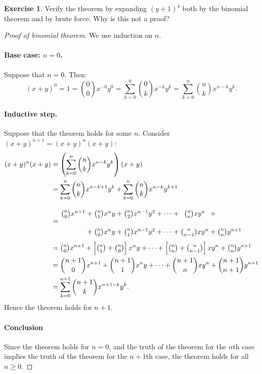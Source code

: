 \documentclass[a4paper,leqno]{article}
\numberwithin{equation}{section}
\theoremstyle{definition}
\newtheorem{exercise}[equation]{Exercise}
\theoremstyle{remark}
\begin{document}
\begin{exercise}
  Verify the theorem by expanding $ (y + 1)^4 $ both by the binomial theorem and by brute force. Why is this not a proof?
\end{exercise}

\begin{proof}[Proof of binomial theorem]
  We use induction on $ n $.

  \paragraph{Base case: $ n = 0 $.}
  Suppose that $ n = 0 $. Then:
  \begin{displaymath}
    (x + y)^0 = 1 = \binom{0}{0} x^{-0} y^0 = \sum_{k = 0}^0 \binom{0}{k} x^{-k} y^k = \sum_{k = 0}^n \binom{n}{k} x^{n - k} y^k.
  \end{displaymath}

  \paragraph{Inductive step.}
  Suppose that the theorem holds for some $ n $. Consider $ (x + y)^{n + 1} = (x + y)^n (x + y) $:
  \begin{align*}
    (x + y)^n (x + y) &= \left(\sum_{k = 0}^n \binom{n}{k} x^{n - k} y^k\right)(x + y)\\
                      &= \sum_{k = 0}^n \binom{n}{k} x^{n - k + 1} y^k + \sum_{k = 0}^n \binom{n}{k} x^{n - k} y^{k + 1}\\
                      &= \arraycolsep=1.2pt\def\arraystretch{2.2}\begin{array}{ccccccccccc}
                           \binom{n}{0} x^{n + 1} &+& \binom{n}{1} x^n y &+& \binom{n}{2} x^{n - 1} y^2 &+& \cdots &+& \binom{n}{n} x y^n &+&\\
                                                  &+& \binom{n}{0} x^n y &+& \binom{n}{1} x^{n - 1} y^2 &+& \cdots &+& \binom{n}{n - 1} x y^n &+& \binom{n}{n} y^{n + 1}
                         \end{array}\\
                      &= \tbinom{n}{0} x^{n + 1} + \left[\tbinom{n}{1} + \tbinom{n}{0}\right] x^n y + \cdots
                            + \left[\tbinom{n}{n} + \tbinom{n}{n - 1}\right] x y^n + \tbinom{n}{n} y^{n + 1}\\
                      &= \binom{n + 1}{0} x^{n + 1} + \binom{n + 1}{1} x^n y + \cdots + \binom{n + 1}{n} x y^n + \binom{n + 1}{n + 1} y^{n + 1}\\
                      &= \sum_{k = 0}^{n + 1} \binom{n + 1}{k} x^{n + 1 - k} y^k.
  \end{align*}
  Hence the theorem holds for $ n + 1 $.

  \paragraph{Conclusion}
  Since the theorem holds for $ n = 0 $, and the truth of the theorem for the $ n$th case implies the truth of the theorem for the $ n + 1$th case,
  the theorem holds for all $ n \geq 0 $.
\end{proof}
\end{document}
